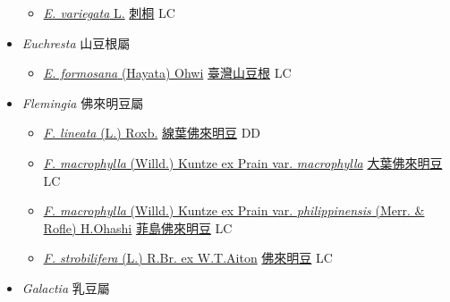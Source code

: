 \begin{itemize}
  \begin{itemize}
        \item[] \href{http://www.theplantlist.org/tpl1.1/search?q=Erythrina+variegata}{\textit{E. variegata} L.}   \href{\detokenize{http://taibnet.sinica.edu.tw/chi/taibnet_species_list.php?T2=刺桐&T2_new_value=true&fr=y}}{刺桐} LC
  \end{itemize}
 \item[] \textit{Euchresta} 山豆根屬
                    
  \begin{itemize}
        \item[] \href{http://www.theplantlist.org/tpl1.1/search?q=Euchresta+formosana}{\textit{E. formosana} (Hayata) Ohwi}   \href{\detokenize{http://taibnet.sinica.edu.tw/chi/taibnet_species_list.php?T2=臺灣山豆根&T2_new_value=true&fr=y}}{臺灣山豆根} LC
  \end{itemize}
 \item[] \textit{Flemingia} 佛來明豆屬
                    
  \begin{itemize}
        \item[] \href{http://www.theplantlist.org/tpl1.1/search?q=Flemingia+lineata}{\textit{F. lineata} (L.) Roxb.}   \href{\detokenize{http://taibnet.sinica.edu.tw/chi/taibnet_species_list.php?T2=線葉佛來明豆&T2_new_value=true&fr=y}}{線葉佛來明豆} DD
        \item[] \href{http://www.theplantlist.org/tpl1.1/search?q=Flemingia+macrophylla+var.+macrophylla}{\textit{F. macrophylla} (Willd.) Kuntze ex Prain var. \textit{macrophylla}}   \href{\detokenize{http://taibnet.sinica.edu.tw/chi/taibnet_species_list.php?T2=大葉佛來明豆&T2_new_value=true&fr=y}}{大葉佛來明豆} LC
        \item[] \href{http://www.theplantlist.org/tpl1.1/search?q=Flemingia+macrophylla+var.+philippinensis}{\textit{F. macrophylla} (Willd.) Kuntze ex Prain var. \textit{philippinensis} (Merr. \& Rofle) H.Ohashi}   \href{\detokenize{http://taibnet.sinica.edu.tw/chi/taibnet_species_list.php?T2=菲島佛來明豆&T2_new_value=true&fr=y}}{菲島佛來明豆} LC
        \item[] \href{http://www.theplantlist.org/tpl1.1/search?q=Flemingia+strobilifera}{\textit{F. strobilifera} (L.) R.Br. ex W.T.Aiton}   \href{\detokenize{http://taibnet.sinica.edu.tw/chi/taibnet_species_list.php?T2=佛來明豆&T2_new_value=true&fr=y}}{佛來明豆} LC
  \end{itemize}
 \item[] \textit{Galactia} 乳豆屬
                    

\end{itemize}
